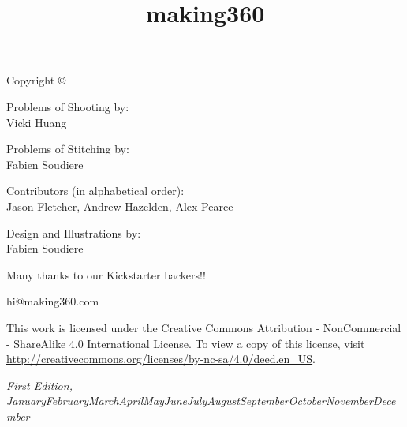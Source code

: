 \documentclass[notoc, justified]{tufte-book}
\title{making360} %
\author{} %
\newcommand{\monthyear}{\ifcase\month\or January\or February\or March\or April\or May\or June\or July\or August\or September\or October\or November\or December\fi\space\number\year} %
\begin{document}
\setlength{\parskip}{12pt}
\setlength{\parindent}{0pt}
\let\cleardoublepage\clearpage


\frontmatter


\maketitlepage


\newpage
\thispagestyle{empty}
\setlength{\parindent}{0pt}
\setlength{\parskip}{\baselineskip}
Copyright \copyright\ \the\year\ \thanklessauthor


\begin{fullwidth}

\par{Problems of Shooting by:
\\
Vicki Huang}

\par{Problems of Stitching by:
\\
Fabien Soudiere}

\par{Contributors (in alphabetical order):
\\
Jason Fletcher, Andrew Hazelden, Alex Pearce}

\par{Design and Illustrations by: 
\\
Fabien Soudiere}

\par{Many thanks to our Kickstarter backers!!}

\par{hi@making360.com}

\par This work is licensed under the Creative Commons Attribution - NonCommercial - ShareAlike 4.0 International License. To view a copy of this license, visit \url{http://creativecommons.org/licenses/by-nc-sa/4.0/deed.en_US}.

\par\textit{First Edition, \monthyear}
\end{fullwidth}
\clearpage


\end{document}
